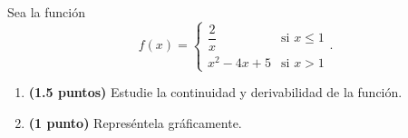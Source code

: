 
Sea la función
\[
f(x)=\begin{cases}\dfrac{2}{x}&\text{si }x\leq1\\[0.8em]x^2-4x+5&\text{si }x>1\end{cases}.
\]
\begin{enumerate}[label=\alph*)]
\item \textbf{(1.5 puntos)} Estudie la continuidad y derivabilidad de la función.
\item \textbf{(1 punto)} Represéntela gráficamente.
\end{enumerate}
